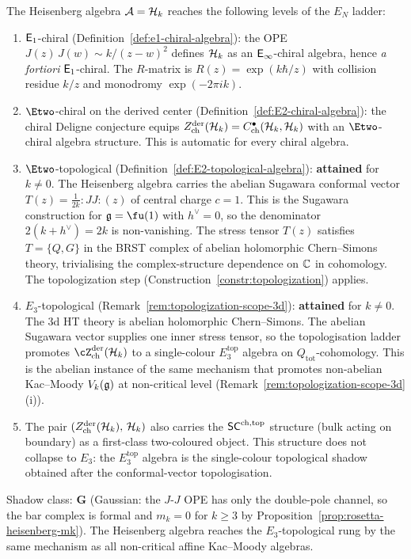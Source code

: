 \begin{remark}
\label{rem:heisenberg-EN-level}
The Heisenberg algebra $\mathcal{A} = \mathcal{H}_k$ reaches the following
levels of the $E_N$ ladder:
\begin{enumerate}[label=\textup{(\roman*)}]
\item $\mathsf{E}_1$-chiral
 (Definition~\ref{def:e1-chiral-algebra}): the OPE
 $J(z)\,J(w) \sim k/(z-w)^2$ defines $\mathcal{H}_k$ as an
 $\mathsf{E}_{\infty}$-chiral algebra, hence \emph{a fortiori}
 $\mathsf{E}_1$-chiral. The $R$-matrix is
 $R(z) = \exp(k\hbar/z)$ with collision residue $k/z$
 and monodromy $\exp(-2\pi i k)$.

\item $\Etwo$-chiral on the derived center
 (Definition~\ref{def:E2-chiral-algebra}): the chiral
 Deligne conjecture equips
 $Z^{\mathrm{der}}_{\mathrm{ch}}(\mathcal{H}_k)
 = C^\bullet_{\mathrm{ch}}(\mathcal{H}_k, \mathcal{H}_k)$
 with an $\Etwo$-chiral algebra structure. This is
 automatic for every chiral algebra.

\item $\Etwo$-topological
 (Definition~\ref{def:E2-topological-algebra}):
 \textbf{attained} for $k \ne 0$. The Heisenberg algebra
 carries the abelian Sugawara conformal vector
 $T(z) = \frac{1}{2k}{:}JJ{:}(z)$ of central charge $c = 1$.
 This is the Sugawara construction for $\fg = \fu(1)$ with
 $h^\vee = 0$, so the denominator $2(k + h^\vee) = 2k$ is
 non-vanishing.
 The stress tensor $T(z)$ satisfies $T = \{Q, G\}$ in the
 BRST complex of abelian holomorphic Chern--Simons theory,
 trivialising the complex-structure dependence on $\mathbb{C}$ in
 cohomology. The topologization step
 (Construction~\ref{constr:topologization}) applies.

\item $E_3$-topological
 (Remark~\ref{rem:topologization-scope-3d}):
 \textbf{attained} for $k \ne 0$.
 The $3$d HT theory is abelian holomorphic Chern--Simons.
 The abelian Sugawara vector supplies one inner stress tensor, so
 the topologisation ladder promotes
 $\cZ^{\mathrm{der}}_{\mathrm{ch}}(\cH_k)$ to a single-colour
 $E_3^{\mathrm{top}}$ algebra on $Q_{\mathrm{tot}}$-cohomology.
 This is the abelian instance of the same mechanism
 that promotes non-abelian Kac--Moody $V_k(\mathfrak{g})$ at
 non-critical level
 (Remark~\ref{rem:topologization-scope-3d}\textup{(i)}).

\item The pair
 $(Z^{\mathrm{der}}_{\mathrm{ch}}(\mathcal{H}_k),\, \mathcal{H}_k)$
 also carries the $\mathsf{SC}^{\mathrm{ch,top}}$ structure
 (bulk acting on boundary) as a first-class two-coloured object.
 This structure does not collapse to $E_3$: the $E_3^{\mathrm{top}}$
 algebra is the single-colour topological shadow obtained after the
 conformal-vector topologisation.
\end{enumerate}
Shadow class: $\mathbf{G}$ (Gaussian: the $J$-$J$
OPE has only the double-pole channel, so the bar complex is formal and
$m_k = 0$ for $k \ge 3$ by
Proposition~\ref{prop:rosetta-heisenberg-mk}).
The Heisenberg algebra reaches the $E_3$-topological rung by the same mechanism as all non-critical
affine Kac--Moody algebras.
\end{remark}

